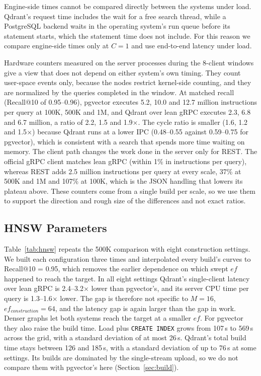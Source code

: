 \documentclass[preprint,12pt]{elsarticle}
\begin{document}
Engine-side times cannot be compared directly between the systems under load. Qdrant's
request time includes the wait for a free search thread, while a PostgreSQL backend
waits in the operating system's run queue before its statement starts, which the
statement time does not include. For this reason we compare engine-side times only at
$C=1$ and use end-to-end latency under load.

Hardware counters measured on the server processes during the 8-client windows give a
view that does not depend on either system's own timing. They count user-space events
only, because the nodes restrict kernel-side counting, and they are normalized by the
queries completed in the window. At matched recall (Recall@10 of 0.95--0.96), pgvector
executes 5.2, 10.0 and 12.7 million instructions per query at 100K, 500K and 1M, and
Qdrant over lean gRPC executes 2.3, 6.8 and 6.7 million, a ratio of 2.2, 1.5 and
1.9$\times$. The cycle ratio is smaller (1.6, 1.2 and 1.5$\times$) because Qdrant runs
at a lower IPC (0.48--0.55 against 0.59--0.75 for pgvector), which is consistent with a
search that spends more time waiting on memory. The client path changes the work done in
the server only for REST. The official gRPC client matches lean gRPC (within 1\% in
instructions per query), whereas REST adds 2.5 million instructions per query at every
scale, 37\% at 500K and 1M and 107\% at 100K, which is the JSON handling that lowers its
plateau above. These counters come from a single build per scale, so we use them to
support the direction and rough size of the differences and not exact ratios.

\subsection{HNSW Parameters}
\label{sec:hnsw}

Table~\ref{tab:hnsw} repeats the 500K comparison with eight construction settings. We
built each configuration three times and interpolated every build's curves to
Recall@10 = 0.95, which removes the earlier dependence on which swept $ef$ happened to
reach the target. In all eight settings Qdrant's single-client latency over lean gRPC is
2.4--3.2$\times$ lower than pgvector's, and its server CPU time per query is
1.3--1.6$\times$ lower. The gap is therefore not specific to $M=16$,
$ef_{construction}=64$, and the latency gap is again larger than the gap in work. Denser
graphs let both systems reach the target at a smaller $ef$. For pgvector they also raise
the build time. Load plus \texttt{CREATE INDEX} grows from 107\,s to 569\,s across the
grid, with a standard deviation of at most 26\,s. Qdrant's total build time stays between
126 and 185\,s, with a standard deviation of up to 76\,s at some settings. Its builds
are dominated by the single-stream upload, so we do not compare them with pgvector's here
(Section~\ref{sec:build}).
\end{document}
